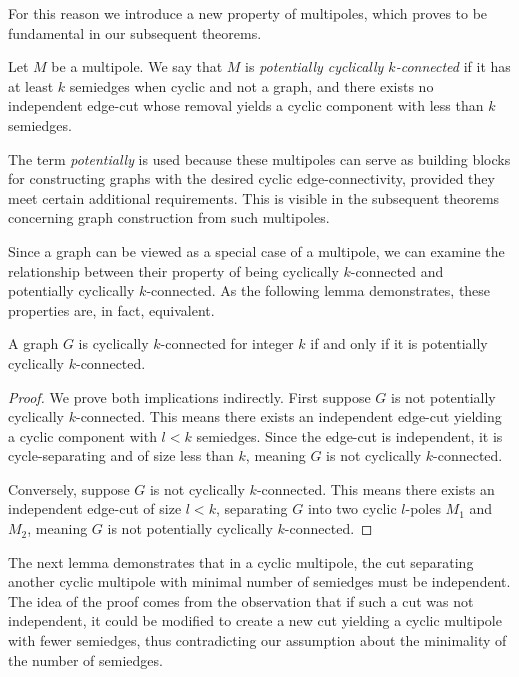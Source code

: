 \documentclass[12pt, twoside]{book}
\begin{document}
For this reason we introduce a new property of multipoles, which proves to be fundamental in our subsequent theorems.

\begin{definition}
	Let $M$ be a multipole. We say that $M$ is \textit{potentially cyclically $k$-connected} if it has at least $k$ semiedges when cyclic and not a graph, and there exists no independent edge-cut whose removal yields a cyclic component with less than $k$ semiedges.
\end{definition}

The term \textit{potentially} is used because these multipoles can serve as building blocks for constructing graphs with the desired cyclic edge-connectivity, provided they meet certain additional requirements. This is visible in the subsequent theorems concerning graph construction from such multipoles.

Since a graph can be viewed as a special case of a multipole, we can examine the relationship between their property of being cyclically $k$-connected and potentially cyclically $k$-connected. As the following lemma demonstrates, these properties are, in fact, equivalent.

\begin{lemma}\label{lem:graphs-potential-and-normal-cyclic-connected-eq}
	A graph $G$ is cyclically $k$-connected for integer $k$ if and only if it is potentially cyclically \mbox{$k$-connected}.
\end{lemma}

\begin{proof}
	We prove both implications indirectly. First suppose $G$ is not potentially cyclically $k$-connected. This means there exists an independent edge-cut yielding a cyclic component with $l<k$ semiedges. Since the edge-cut is independent, it is \mbox{cycle-separating} and of size less than $k$, meaning $G$ is not cyclically $k$-connected.
	
	Conversely, suppose $G$ is not cyclically \mbox{$k$-connected}. This means there exists an independent edge-cut of size $l<k$, separating $G$ into two cyclic $l$-poles $M_1$ and $M_2$, meaning $G$ is not potentially cyclically $k$-connected.
\end{proof}

The next lemma demonstrates that in a cyclic multipole, the cut separating another cyclic multipole with minimal number of semiedges must be independent. The idea of the proof comes from the observation that if such a cut was not independent, it could be modified to create a new cut yielding a cyclic multipole with fewer semiedges, thus contradicting our assumption about the minimality of the number of semiedges.
\end{document}
